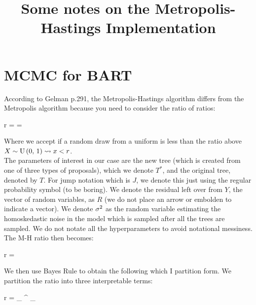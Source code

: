 

\title{Some notes on the Metropolis-Hastings Implementation}

\date{}


\maketitle

\section*{MCMC for BART}

According to Gelman p.291, the Metropolis-Hastings algorithm differs from the Metropolis algorithm because you need to consider the ratio of ratios:

\beqn
r =  = 
\eeqn

Where we accept if a random draw from a uniform is less than the ratio above \ie $X \sim \mathrm{U}\left(0,\,1\right) \leadsto x < r$. \\

The parameters of interest in our case are the new tree (which is created from one of three types of proposals), which we denote $T^*$, and the original tree, denoted by $T$. For jump notation which is $J$, we denote this just using the regular probability symbol (to be boring). We denote the residual left over from $Y$, the vector of random variables, as $R$ (we do not place an arrow or embolden to indicate a vector). We denote $\sigma^2$ as the random variable estimating the homoskedastic noise in the model which is sampled after all the trees are sampled. We do not notate all the hyperparameters to avoid notational messiness. The M-H ratio then becomes:

\beqn
r =  
\eeqn

We then use Bayes Rule to obtain the following which I partition form. We partition the ratio into three interpretable terms:

\beqn
r = _{} \times {}^{} \times {}_{}
\eeqn

